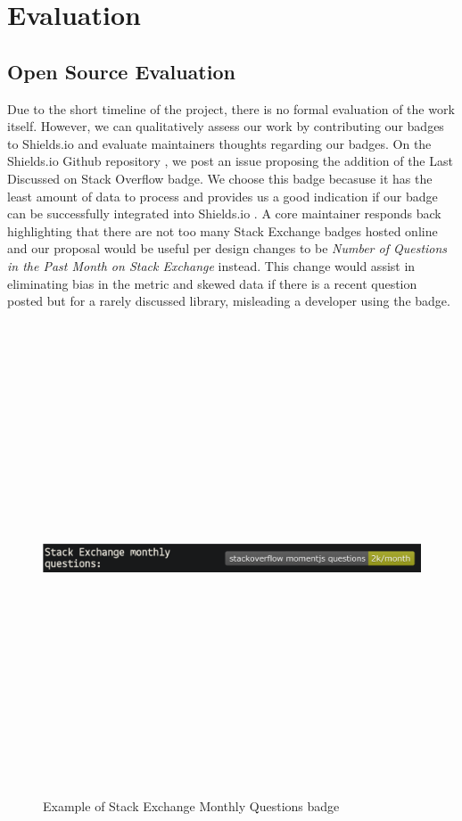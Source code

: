 \documentclass[12pt, letterpaper]{article}
\begin{document}
\section{Evaluation}

\subsection{Open Source Evaluation}

Due to the short timeline of the project, there is no formal evaluation of the work itself.
However, we can qualitatively assess our work by contributing our badges to Shields.io \cite{shields}
and evaluate maintainers thoughts regarding our badges. On the Shields.io Github repository \cite{shieldsrepo}, 
we post an issue \cite{shieldsissue} proposing the addition of the Last Discussed on Stack Overflow badge.
We choose this badge becasuse it has the least amount of data to process and provides us a good indication
if our badge can be successfully integrated into Shields.io \cite{shields}.
A core maintainer responds back highlighting that there are not too many Stack Exchange badges hosted online
and our proposal would be
useful per design changes to be \textit{Number of Questions in the Past Month on Stack Exchange} instead. 
This change would assist in eliminating bias in the metric and skewed data if there is a recent question posted but
for a rarely discussed library, misleading a developer using the badge.


\begin{figure}[!htb]
    \centerline{
        \includegraphics[width=14cm,height=14cm,keepaspectratio=true]{semonthlybadge}
    }
    \caption{
        Example of Stack Exchange Monthly Questions badge
    }
    \label{semonthlybadge}
\end{figure}
\end{document}
